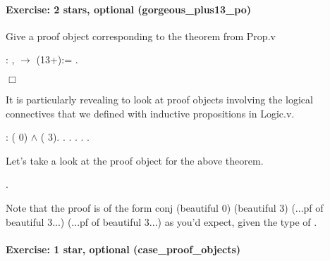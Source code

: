 \documentclass[12pt]{report}
\begin{document}
\paragraph{Exercise: 2 stars, optional (gorgeous\_plus13\_po)}

 Give a proof object corresponding to the theorem  from Prop.v \begin{coqdoccode}
\coqdocemptyline
\coqdocnoindent
{} : \coqdockw{\ensuremath{\forall}} ,   \ensuremath{\rightarrow}  (13+):=\coqdoceol
\coqdocindent{1.50em}
 .\coqdoceol
\end{coqdoccode}
\ensuremath{\Box} 

 It is particularly revealing to look at proof objects involving the 
logical connectives that we defined with inductive propositions in Logic.v. \begin{coqdoccode}
\coqdocemptyline
\coqdocnoindent
{}  : \coqdoceol
\coqdocindent{1.00em}
( 0) \ensuremath{\land} ( 3).\coqdoceol
\coqdocnoindent
{}.\coqdoceol
\coqdocindent{1.00em}
 .\coqdoceol
  .\coqdoceol
  . .\coqdoceol
\coqdocemptyline
\end{coqdoccode}
Let's take a look at the proof object for the above theorem. \begin{coqdoccode}
\coqdocemptyline
\coqdocnoindent
{} .\coqdoceol
\coqdocemptyline
\end{coqdoccode}
Note that the proof is of the form
    conj (beautiful 0) (beautiful 3) 
         (...pf of beautiful 3...) (...pf of beautiful 3...)
    as you'd expect, given the type of . 

\paragraph{Exercise: 1 star, optional (case\_proof\_objects)}
\end{document}

